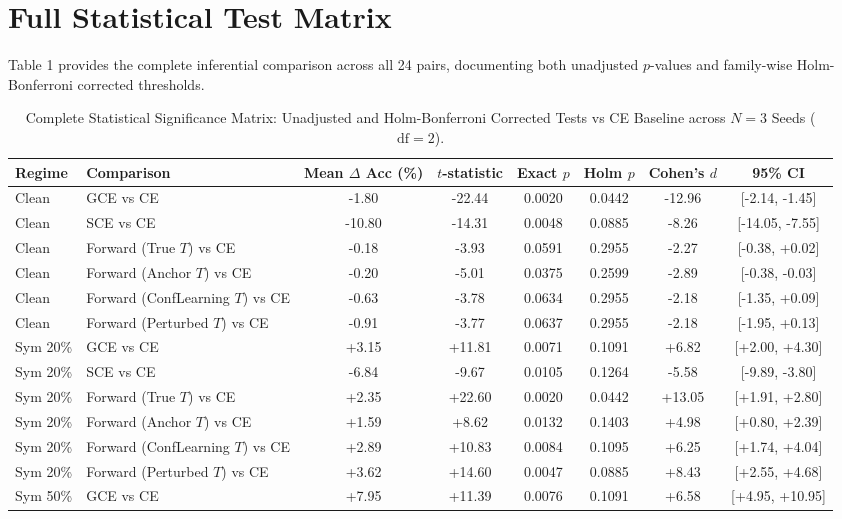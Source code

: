 \documentclass[11pt,onecolumn]{article}
\begin{document}
\section{Full Statistical Test Matrix}
Table 1 provides the complete inferential comparison across all 24 pairs, documenting both unadjusted $p$-values and family-wise Holm-Bonferroni corrected thresholds.

\begin{table}[h]
\centering
\caption{Complete Statistical Significance Matrix: Unadjusted and Holm-Bonferroni Corrected Tests vs CE Baseline across $N=3$ Seeds ($\text{df}=2$).}
\small
\begin{tabular}{llcccccc}
\toprule
\textbf{Regime} & \textbf{Comparison} & \textbf{Mean $\Delta$ Acc (\%)} & \textbf{$t$-statistic} & \textbf{Exact $p$} & \textbf{Holm $p$} & \textbf{Cohen's $d$} & \textbf{95\% CI} \\
\midrule
Clean & GCE vs CE & -1.80 & -22.44 & 0.0020 & 0.0442 & -12.96 & [-2.14, -1.45] \\
Clean & SCE vs CE & -10.80 & -14.31 & 0.0048 & 0.0885 & -8.26 & [-14.05, -7.55] \\
Clean & Forward (True $T$) vs CE & -0.18 & -3.93 & 0.0591 & 0.2955 & -2.27 & [-0.38, +0.02] \\
Clean & Forward (Anchor $T$) vs CE & -0.20 & -5.01 & 0.0375 & 0.2599 & -2.89 & [-0.38, -0.03] \\
Clean & Forward (ConfLearning $T$) vs CE & -0.63 & -3.78 & 0.0634 & 0.2955 & -2.18 & [-1.35, +0.09] \\
Clean & Forward (Perturbed $T$) vs CE & -0.91 & -3.77 & 0.0637 & 0.2955 & -2.18 & [-1.95, +0.13] \\
\midrule
Sym 20\% & GCE vs CE & +3.15 & +11.81 & 0.0071 & 0.1091 & +6.82 & [+2.00, +4.30] \\
Sym 20\% & SCE vs CE & -6.84 & -9.67 & 0.0105 & 0.1264 & -5.58 & [-9.89, -3.80] \\
Sym 20\% & Forward (True $T$) vs CE & +2.35 & +22.60 & 0.0020 & 0.0442 & +13.05 & [+1.91, +2.80] \\
Sym 20\% & Forward (Anchor $T$) vs CE & +1.59 & +8.62 & 0.0132 & 0.1403 & +4.98 & [+0.80, +2.39] \\
Sym 20\% & Forward (ConfLearning $T$) vs CE & +2.89 & +10.83 & 0.0084 & 0.1095 & +6.25 & [+1.74, +4.04] \\
Sym 20\% & Forward (Perturbed $T$) vs CE & +3.62 & +14.60 & 0.0047 & 0.0885 & +8.43 & [+2.55, +4.68] \\
\midrule
Sym 50\% & GCE vs CE & +7.95 & +11.39 & 0.0076 & 0.1091 & +6.58 & [+4.95, +10.95] \\

\end{tabular}
\end{table}
\end{document}
